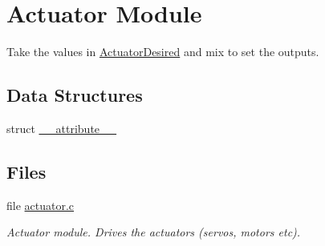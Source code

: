 \hypertarget{group___actuator_module}{\section{\-Actuator \-Module}
\label{group___actuator_module}
}


\-Take the values in \hyperlink{group___actuator_desired}{\-Actuator\-Desired} and mix to set the outputs.  


\subsection*{\-Data \-Structures}
\begin{DoxyCompactItemize}
\item 
struct \hyperlink{struct____attribute____}{\-\_\-\-\_\-attribute\-\_\-\-\_\-}
\end{DoxyCompactItemize}
\subsection*{\-Files}
\begin{DoxyCompactItemize}
\item 
file \hyperlink{actuator_8c}{actuator.\-c}
\begin{DoxyCompactList}\small\item\em \-Actuator module. \-Drives the actuators (servos, motors etc). \end{DoxyCompactList}\end{DoxyCompactItemize}

